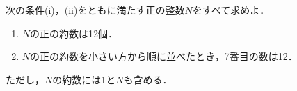 \documentclass[../../main.tex]{subfiles}
\begin{document}
次の条件(i)，(ii)をともに満たす正の整数$N$をすべて求めよ．
\begin{enumerate}
  \item$N$の正の約数は12個．
  \item$N$の正の約数を小さい方から順に並べたとき，7番目の数は12．
\end{enumerate}
ただし，$N$の約数には1と$N$も含める．
\end{document}
